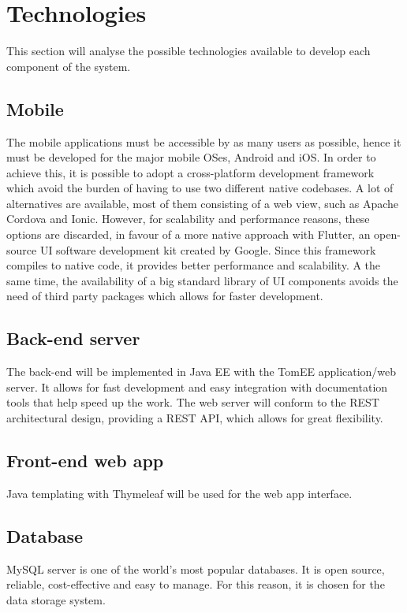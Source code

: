 \clearpage

\section{Technologies}
This section will analyse the possible technologies available to develop each component of the system.

\subsection{Mobile}
The mobile applications must be accessible by as many users as possible, hence it must be developed for the major mobile OSes, Android and iOS.
In order to achieve this, it is possible to adopt a cross-platform development framework which  avoid the burden of having to use two different native codebases.
A lot of alternatives are available, most of them consisting of a web view, such as Apache Cordova and Ionic. 
However, for scalability and performance reasons, these options are discarded, in favour of a more native approach with Flutter, an open-source UI software development kit created by Google.
Since this framework compiles to native code, it provides better performance and scalability. A the same time, the availability of a big standard library of UI components avoids the need of third party packages which allows for faster development.

\subsection{Back-end server}
The back-end will be implemented in Java EE with the TomEE application/web server.
It allows for fast development and easy integration with documentation tools that help speed up the work.\newline
The web server will conform to the REST architectural design, providing a REST API, which allows for great flexibility.
 
\subsection{Front-end web app}
Java templating with Thymeleaf will be used for the web app interface.

\subsection{Database}
MySQL server is one of the world’s most popular databases. It is open source, reliable, cost-effective and easy to manage. For this reason, it is chosen for the data storage system.
